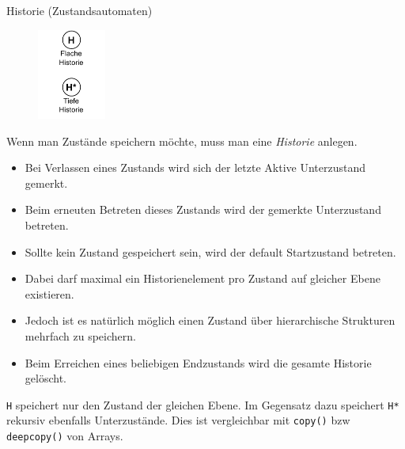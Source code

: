 \begin{diag}{Historie (Zustandsautomaten)}
    \begin{figure}
        \centering
        \includegraphics[width=0.2\textwidth]{includes/figures/defi_diagrams_state_history.pdf}
    \end{figure}
    Wenn man Zustände speichern möchte, muss man eine \emph{Historie} anlegen.

    \begin{itemize}
        \item Bei Verlassen eines Zustands wird sich der letzte Aktive Unterzustand gemerkt.
        \item Beim erneuten Betreten dieses Zustands wird der gemerkte Unterzustand betreten.
        \item Sollte kein Zustand gespeichert sein, wird der default Startzustand betreten.
        \item Dabei darf maximal ein Historienelement pro Zustand auf gleicher Ebene existieren.
        \item Jedoch ist es natürlich möglich einen Zustand über hierarchische Strukturen mehrfach zu speichern.
        \item Beim Erreichen eines beliebigen Endzustands wird die gesamte Historie gelöscht.
    \end{itemize}

    \texttt{H} speichert nur den Zustand der gleichen Ebene.
    Im Gegensatz dazu speichert \texttt{H*} rekursiv ebenfalls Unterzustände. Dies ist vergleichbar mit \texttt{copy()} bzw \texttt{deepcopy()} von Arrays.
\end{diag}

